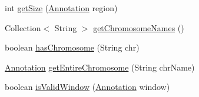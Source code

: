 \begin{DoxyCompactItemize}
\item 
int \hyperlink{classumms_1_1core_1_1coordinatesystem_1_1_masked_genomic_space_a021ea20a50d2940b947c69a80ff0103b}{get\+Size} (\hyperlink{interfaceumms_1_1core_1_1annotation_1_1_annotation}{Annotation} region)
\item 
Collection$<$ String $>$ \hyperlink{classumms_1_1core_1_1coordinatesystem_1_1_masked_genomic_space_a6034d7102a4450c672379f7b8973b9b5}{get\+Chromosome\+Names} ()
\item 
boolean \hyperlink{classumms_1_1core_1_1coordinatesystem_1_1_masked_genomic_space_a0adc21c3d7b4f6461f5c7c33c71c2923}{has\+Chromosome} (String chr)
\item 
\hyperlink{interfaceumms_1_1core_1_1annotation_1_1_annotation}{Annotation} \hyperlink{classumms_1_1core_1_1coordinatesystem_1_1_masked_genomic_space_a1a71e4fed6519abf120e78f798ece9be}{get\+Entire\+Chromosome} (String chr\+Name)
\item 
boolean \hyperlink{classumms_1_1core_1_1coordinatesystem_1_1_masked_genomic_space_aa9b95648e84134a9ddf6229dda7b66c3}{is\+Valid\+Window} (\hyperlink{interfaceumms_1_1core_1_1annotation_1_1_annotation}{Annotation} window)
\end{DoxyCompactItemize}


